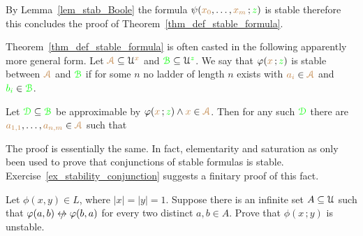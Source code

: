 


By Lemma~\ref{lem_stab_Boole} the formula $\psi({\color{brown} x_0},\dots,{\color{brown} x_m}\,;{\color{green} z})$ is stable therefore this concludes the proof of Theorem~\ref{thm_def_stable_formula}. 

\begin{remark}\label{rem_sability_no_compactness}
  Theorem~\ref{thm_def_stable_formula} is often casted in the following  apparently more general form.
  Let ${\color{brown}\EuScript A}\subseteq\EuScript U^{\color{brown} x}$ and ${\color{green}\EuScript B}\subseteq\EuScript U^{\color{green} z}$.
  We say that $\varphi({\color{brown} x}\,;{\color{green} z})$ is stable between ${\color{brown}\EuScript A}$ and ${\color{green}\EuScript B}$ if for some $n$ no ladder of length $n$ exists with ${\color{brown} a_i}\in{\color{brown}\EuScript A}$ and ${\color{green} b_i}\in{\color{green}\EuScript B}$.

  Let ${\color{green}\EuScript D}\subseteq{\color{green}\EuScript B}$ be approximable by $\varphi({\color{brown} x}\,;{\color{green} z})\wedge {\color{brown}x}\in{\color{brown}\EuScript A}$.
  Then for any such ${\color{green}\EuScript D}$ there are ${\color{brown} a_{1,1}},\dots,{\color{brown} a_{n,m}}\in {\color{brown}\EuScript A}$ such that 
  
  
  The proof is essentially the same. 
  In fact, elementarity and saturation as only been used to prove that conjunctions of stable formulas is stable.
  Exercise~\ref{ex_stability_conjunction} suggests a finitary proof of this fact.
\end{remark} 

\begin{exercise}
  Let $\phi(x,y)\in  L$, where $|x|=|y|=1$.
  Suppose there is an infinite set $A\subseteq\EuScript U$ such that $\phi(a,b)\niff\phi(b,a)$ for every two distinct $a,b\in A$.
  Prove that $\phi(x\,;y)$ is unstable.
\end{exercise}


  
